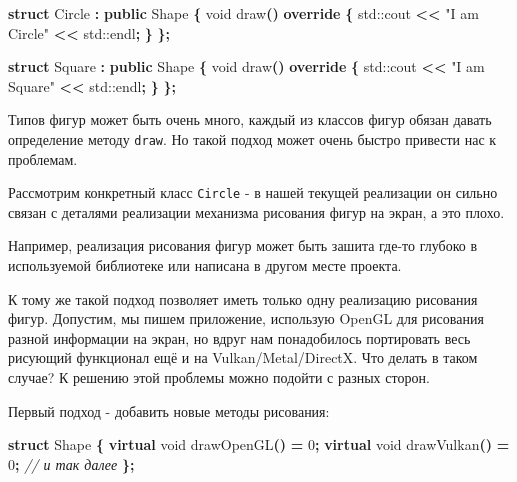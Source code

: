 \documentclass[14pt,a4paper]{article}
\newenvironment{Shaded}{\begin{paragraph}}{\end{paragraph}}
\newenvironment{Highlighting}{\begin{paragraph}}{\end{paragraph}}
\newcommand{\KeywordTok}[1]{\textcolor[rgb]{0.13,0.29,0.53}{\textbf{#1}}}
\newcommand{\DataTypeTok}[1]{\textcolor[rgb]{0.13,0.29,0.53}{#1}}
\newcommand{\DecValTok}[1]{\textcolor[rgb]{0.00,0.00,0.81}{#1}}
\newcommand{\StringTok}[1]{\textcolor[rgb]{0.31,0.60,0.02}{#1}}
\newcommand{\CommentTok}[1]{\textcolor[rgb]{0.56,0.35,0.01}{\textit{#1}}}
\newcommand{\OperatorTok}[1]{\textcolor[rgb]{0.81,0.36,0.00}{\textbf{#1}}}
\newcommand{\BuiltInTok}[1]{#1}
\newcommand{\NormalTok}[1]{#1}
\begin{document}
\begin{Shaded}
\begin{Highlighting}[]
\KeywordTok{struct}\NormalTok{ Circle }\OperatorTok{:} \KeywordTok{public}\NormalTok{ Shape }\OperatorTok{\{}
    \DataTypeTok{void}\NormalTok{ draw}\OperatorTok{()} \KeywordTok{override} \OperatorTok{\{}
        \BuiltInTok{std::}\NormalTok{cout}\OperatorTok{ \textless{}\textless{}} \StringTok{"I am Circle"} \OperatorTok{\textless{}\textless{}} \BuiltInTok{std::}\NormalTok{endl}\OperatorTok{;}
    \OperatorTok{\}}
\OperatorTok{\};}

\KeywordTok{struct}\NormalTok{ Square }\OperatorTok{:} \KeywordTok{public}\NormalTok{ Shape }\OperatorTok{\{}
    \DataTypeTok{void}\NormalTok{ draw}\OperatorTok{()} \KeywordTok{override} \OperatorTok{\{}
        \BuiltInTok{std::}\NormalTok{cout}\OperatorTok{ \textless{}\textless{}} \StringTok{"I am Square"} \OperatorTok{\textless{}\textless{}} \BuiltInTok{std::}\NormalTok{endl}\OperatorTok{;}
    \OperatorTok{\}}
\OperatorTok{\};}
\end{Highlighting}
\end{Shaded}

Типов фигур может быть очень много, каждый из классов фигур обязан
давать определение методу \texttt{draw}. Но такой подход может очень
быстро привести нас к проблемам.

Рассмотрим конкретный класс \texttt{Circle} - в нашей текущей реализации
он сильно связан с деталями реализации механизма рисования фигур на
экран, а это плохо.

Например, реализация рисования фигур может быть зашита где-то глубоко в
используемой библиотеке или написана в другом месте проекта.

К тому же такой подход позволяет иметь только одну реализацию рисования
фигур. Допустим, мы пишем приложение, использую OpenGL для рисования
разной информации на экран, но вдруг нам понадобилось портировать весь
рисующий функционал ещё и на Vulkan/Metal/DirectX. Что делать в таком
случае? К решению этой проблемы можно подойти с разных сторон.

Первый подход - добавить новые методы рисования:

\begin{Shaded}
\begin{Highlighting}[]
\KeywordTok{struct}\NormalTok{ Shape }\OperatorTok{\{}
    \KeywordTok{virtual} \DataTypeTok{void}\NormalTok{ drawOpenGL}\OperatorTok{()} \OperatorTok{=} \DecValTok{0}\OperatorTok{;}
    \KeywordTok{virtual} \DataTypeTok{void}\NormalTok{ drawVulkan}\OperatorTok{()} \OperatorTok{=} \DecValTok{0}\OperatorTok{;}
    \CommentTok{// и так далее}
\OperatorTok{\};}
\end{Highlighting}
\end{Shaded}
\end{document}
